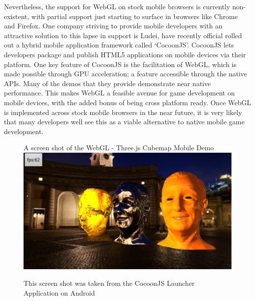 \documentclass[final]{cmpreport}
\begin{document}
Nevertheless, the support for WebGL on stock mobile browsers is currently non-existent, with partial support just starting to surface in browsers like Chrome and Firefox. One company striving to provide mobile developers with an attractive solution to this lapse in support is Ludei, have recently official rolled out a hybrid mobile application framework called `CocoonJS'. CocoonJS lets developers package and publish HTML5 applications on mobile devices via their platform. One key feature of CocoonJS is the facilitation of WebGL, which is made possible through GPU acceleration; a feature accessible through the native APIs. Many of the demos that they provide demonstrate near native performance. This makes WebGL a feasible avenue for game development on mobile devices, with the added bonus of being cross platform ready. Once WebGL is implemented across stock mobile browsers in the near future, it is very likely that many developers well see this as a viable alternative to native mobile game development.

\begin{figure}[h!]{A screen shot of the WebGL - Three.js Cubemap Mobile Demo}
  \includegraphics[width=1.0\textwidth]{webgl.png}
  \begin{tablenotes}
    \item This screen shot was taken from the CocoonJS Launcher Application on Android\footnotemark[16]
  \end{tablenotes}
\end{figure}

\end{document}
